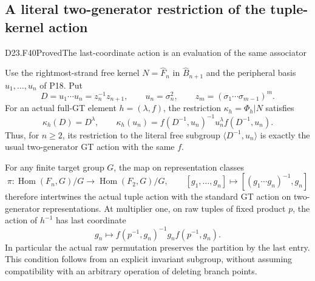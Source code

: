 \subsection{A literal two-generator restriction of the tuple-kernel action}

\begin{statement}{D23.F40}{Proved}{The last-coordinate action is an evaluation of the same associator}
\end{statement}
Use the rightmost-strand free kernel $N=\widehat F_n$ in
$\widehat B_{n+1}$ and the peripheral basis $u_1,\ldots,u_n$
of P18. Put
\[
 D=u_1\cdots u_n=z_n^{-1}z_{n+1},\qquad u_n=\sigma_n^2,
 \qquad z_m=(\sigma_1\cdots\sigma_{m-1})^m.
\]
For an actual full-GT element $h=(\lambda,f)$, the restriction
$\kappa_h=\Phi_h|N$ satisfies
\[
 \kappa_h(D)=D^\lambda,
 \qquad
 \kappa_h(u_n)=f(D^{-1},u_n)^{-1}u_n^\lambda f(D^{-1},u_n).
                                                        \tag{D23.F40.1}
\]
Thus, for $n\geq2$, its restriction to the literal free
subgroup $\langle D^{-1},u_n\rangle$ is exactly the usual
two-generator GT action with the same $f$.

For any finite target group $G$, the map on representation
classes
\[
 \pi:\operatorname{Hom}(F_n,G)/G\longrightarrow
             \operatorname{Hom}(F_2,G)/G,
 \qquad
 [g_1,\ldots,g_n]\longmapsto
                  [(g_1\cdots g_n)^{-1},g_n]
                                                        \tag{D23.F40.2}
\]
therefore intertwines the actual tuple action with the
standard GT action on two-generator representations.
At multiplier one, on raw tuples of fixed product $p$,
the action of $h^{-1}$ has last coordinate
\[
           g_n\longmapsto
             f(p^{-1},g_n)^{-1}g_nf(p^{-1},g_n).
                                                        \tag{D23.F40.3}
\]
In particular the actual raw permutation preserves the
partition by the last entry. This condition follows from an
explicit invariant subgroup, without assuming compatibility
with an arbitrary operation of deleting branch points.

